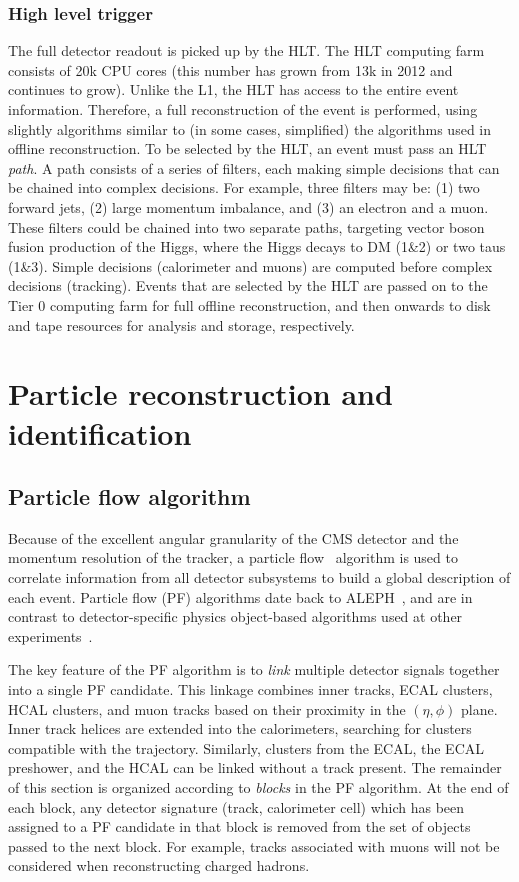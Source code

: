 \subsubsection{High level trigger}

The full detector readout is picked up by the HLT.
The HLT computing farm consists of 20k CPU cores (this number has grown from 13k in 2012 and continues to grow).
Unlike the L1, the HLT has access to the entire event information.
Therefore, a full reconstruction of the event is performed, using slightly algorithms similar to (in some cases, simplified) the algorithms used in offline reconstruction.
To be selected by the HLT, an event must pass an HLT \emph{path}.
A path consists of a series of filters, each making simple decisions that can be chained into complex decisions.
For example, three filters may be: (1) two forward jets, (2) large momentum imbalance, and (3) an electron and a muon.
These filters could be chained into two separate paths, targeting vector boson fusion production of the Higgs, where the Higgs decays to DM (1\&2) or two taus (1\&3).
Simple decisions (calorimeter and muons) are computed before complex decisions (tracking).
Events that are selected by the HLT are passed on to the Tier 0 computing farm for full offline reconstruction, and then onwards to disk and tape resources for analysis and storage, respectively.



\section{Particle reconstruction and identification}

\subsection{Particle flow algorithm}

Because of the excellent angular granularity of the CMS detector and the momentum resolution of the tracker, a particle flow~\cite{cmspf} algorithm is used to correlate information from all detector subsystems to build a global description of each event.
Particle flow (PF) algorithms date back to ALEPH~\needcite, and are in contrast to detector-specific physics object-based algorithms used at other experiments~\needcite.

The key feature of the PF algorithm is to \emph{link} multiple detector signals together into a single PF candidate.
This linkage combines inner tracks, ECAL clusters, HCAL clusters, and muon tracks based on their proximity in the $(\eta,\phi)$ plane.
Inner track helices are extended into the calorimeters, searching for clusters compatible with the trajectory.
Similarly, clusters from the ECAL, the ECAL preshower, and the HCAL can be linked without a track present. 
The remainder of this section is organized according to \emph{blocks} in the PF algorithm.
At the end of each block, any detector signature (track, calorimeter cell) which has been assigned to a PF candidate in that block is removed from the set of objects passed to the next block.
For example, tracks associated with muons will not be considered when reconstructing charged hadrons. 

